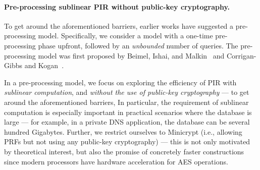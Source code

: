 
\paragraph{Pre-processing sublinear PIR without public-key cryptography.}
To get around the aforementioned barriers,
earlier works have suggested a pre-processing model.
Specifically, we consider a model with a 
one-time pre-processing phase  
upfront, followed by an {\it unbounded} number of queries. 
The pre-processing model was first
proposed by Beimel, Ishai, and Malkin~\cite{bim-pir} and 
Corrigan-Gibbs and Kogan~\cite{sublinearpir}.

In a pre-processing model, 
we focus on exploring the efficiency
of PIR with {\it sublinear computation}, 
and {\it without the use of public-key cryptography} --- 
to get around the aforementioned
barriers,
In particular, the requirement of sublinear computation is especially important
in practical scenarios where the database is large --- for example, in a private
DNS application, the database can be several hundred Gigabytes. 
Further, %
we restrict ourselves to Minicrypt (i.e., allowing PRFs but not using any public-key
cryptography) --- this is not only motivated by theoretical interest,  
but also the promise of concretely faster  constructions since modern processors
have hardware acceleration for AES operations.



